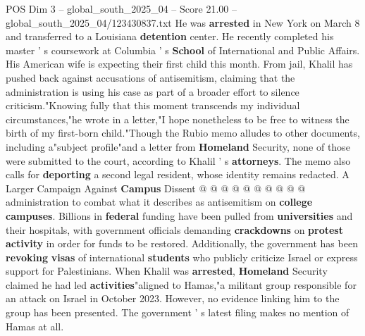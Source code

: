 \begin{textsample}{POS Dim 3 – global\_south\_2025\_04 – Score 21.00 – global\_south\_2025\_04/123430837.txt}
He was \textbf{arrested} in New York on March 8 and transferred to a Louisiana \textbf{detention} center.
He recently completed his master ' s coursework at Columbia ' s \textbf{School} of International and Public Affairs.
His American wife is expecting their first child this month.
From jail, Khalil has pushed back against accusations of antisemitism, claiming that the administration is using his case as part of a broader effort to silence criticism."Knowing fully that this moment transcends my individual circumstances,"he wrote in a letter,"I hope nonetheless to be free to witness the birth of my first-born child."Though the Rubio memo alludes to other documents, including a"subject profile"and a letter from \textbf{Homeland} Security, none of those were submitted to the court, according to Khalil ' s \textbf{attorneys}.
The memo also calls for \textbf{deporting} a second legal resident, whose identity remains redacted.
A Larger Campaign Against \textbf{Campus} Dissent @ @ @ @ @ @ @ @ @ @ administration to combat what it describes as antisemitism on \textbf{college} \textbf{campuses}.
Billions in \textbf{federal} funding have been pulled from \textbf{universities} and their hospitals, with government officials demanding \textbf{crackdowns} on \textbf{protest} \textbf{activity} in order for funds to be restored.
Additionally, the government has been \textbf{revoking} \textbf{visas} of international \textbf{students} who publicly criticize Israel or express support for Palestinians.
When Khalil was \textbf{arrested}, \textbf{Homeland} Security claimed he had led \textbf{activities}"aligned to Hamas,"a militant group responsible for an attack on Israel in October 2023.
However, no evidence linking him to the group has been presented.
The government ' s latest filing makes no mention of Hamas at all.

\end{textsample}
